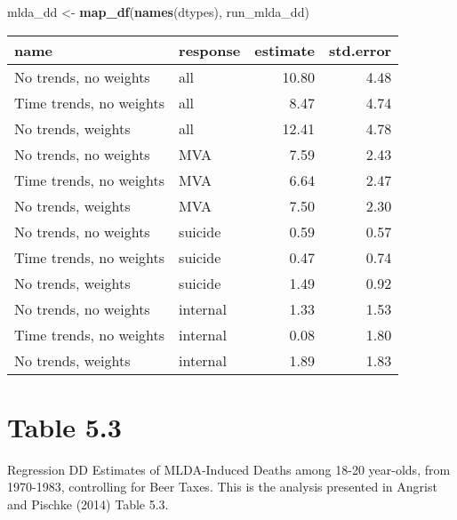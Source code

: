 \documentclass[]{book}
\newenvironment{Shaded}{\begin{snugshade}}{\end{snugshade}}
\newcommand{\DataTypeTok}[1]{\textcolor[rgb]{0.13,0.29,0.53}{#1}}
\newcommand{\DecValTok}[1]{\textcolor[rgb]{0.00,0.00,0.81}{#1}}
\newcommand{\KeywordTok}[1]{\textcolor[rgb]{0.13,0.29,0.53}{\textbf{#1}}}
\newcommand{\NormalTok}[1]{#1}
\newcommand{\OperatorTok}[1]{\textcolor[rgb]{0.81,0.36,0.00}{\textbf{#1}}}
\newcommand{\StringTok}[1]{\textcolor[rgb]{0.31,0.60,0.02}{#1}}
\theoremstyle{definition}
\theoremstyle{definition}
\theoremstyle{definition}
\theoremstyle{remark}
\begin{document}
\begin{Shaded}
\begin{Highlighting}[]
\NormalTok{mlda_dd <-}\StringTok{ }\KeywordTok{map_df}\NormalTok{(}\KeywordTok{names}\NormalTok{(dtypes), run_mlda_dd)}
\end{Highlighting}
\end{Shaded}

\begin{Shaded}
\end{Shaded}

\begin{tabular}{l|l|r|r}
\hline
name & response & estimate & std.error\\
\hline
No trends, no weights & all & 10.80 & 4.48\\
\hline
Time trends, no weights & all & 8.47 & 4.74\\
\hline
No trends, weights & all & 12.41 & 4.78\\
\hline
No trends, no weights & MVA & 7.59 & 2.43\\
\hline
Time trends, no weights & MVA & 6.64 & 2.47\\
\hline
No trends, weights & MVA & 7.50 & 2.30\\
\hline
No trends, no weights & suicide & 0.59 & 0.57\\
\hline
Time trends, no weights & suicide & 0.47 & 0.74\\
\hline
No trends, weights & suicide & 1.49 & 0.92\\
\hline
No trends, no weights & internal & 1.33 & 1.53\\
\hline
Time trends, no weights & internal & 0.08 & 1.80\\
\hline
No trends, weights & internal & 1.89 & 1.83\\
\hline
\end{tabular}

\hypertarget{table-5.3}{%
\section{Table 5.3}\label{table-5.3}}

Regression DD Estimates of MLDA-Induced Deaths among 18-20 year-olds,
from 1970-1983, controlling for Beer Taxes. This is the analysis
presented in Angrist and Pischke (2014) Table 5.3.
\end{document}
